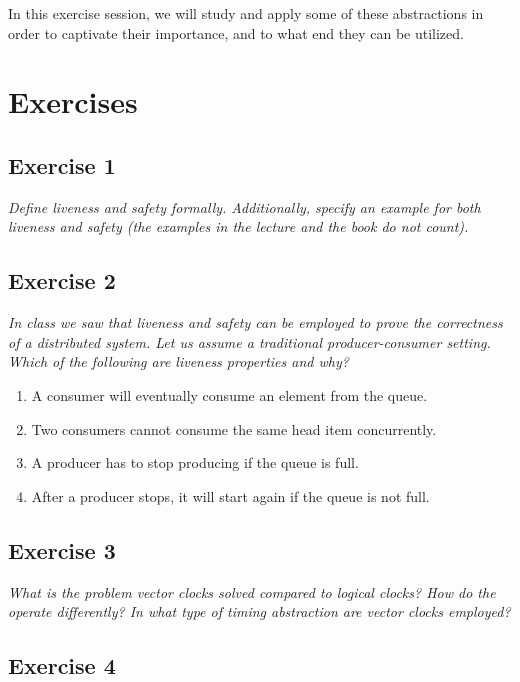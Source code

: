 In this exercise session, we will study and apply some of these abstractions in order to captivate their importance, and to what end they can be utilized.

\section{Exercises}
\label{sec:exercises}

\subsection*{Exercise 1}
\label{sec:exercise_1}

\emph{Define liveness and safety formally. Additionally, specify an example for both liveness and safety (the examples in the lecture and the book do not count).}

\subsection*{Exercise 2}
\label{sec:exercise_2}

\emph{In class we saw that liveness and safety can be employed to prove the correctness of a distributed system. Let us assume a traditional producer-consumer setting. Which of the following are liveness properties and why?}

\begin{enumerate}
\item A consumer will eventually consume an element from the queue.
\item Two consumers cannot consume the same head item concurrently.
\item A producer has to stop producing if the queue is full.
\item After a producer stops, it will start again if the queue is not full.
\end{enumerate}

\subsection*{Exercise 3}
\label{sec:exercise_3}

\emph{What is the problem vector clocks solved compared to logical clocks? How do the operate differently? In what type of timing abstraction are vector clocks employed?}

\subsection*{Exercise 4}
\label{sec:exercise_4}

